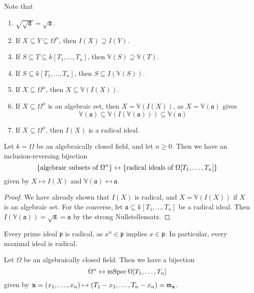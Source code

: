 Note that
\begin{enumerate}
    \item \( \sqrt{\sqrt{\mathfrak a}} = \sqrt{\mathfrak a} \).
    \item If \( X \subseteq Y \subseteq \Omega^n \), then \( I(X) \supseteq I(Y) \).
    \item If \( S \subseteq T \subseteq k[T_1, \dots, T_n] \), then \( \mathbb V(S) \supseteq \mathbb V(T) \).
    \item If \( S \subseteq k[T_1, \dots, T_n] \), then \( S \subseteq I(\mathbb V(S)) \).
    \item If \( X \subseteq \Omega^n \), then \( X \subseteq \mathbb V(I(X)) \).
    \item If \( X \subseteq \Omega^n \) is an algebraic set, then \( X = \mathbb V(I(X)) \), as \( X = \mathbb V(\mathfrak a) \) gives
    \[ \mathbb V(\mathfrak a) \subseteq \mathbb V(I(\mathbb V(\mathfrak a))) \subseteq \mathbb V(\mathfrak a) \]
    \item If \( X \subseteq \Omega^n \), then \( I(X) \) is a radical ideal.
\end{enumerate}
\begin{proposition}
    Let \( k = \Omega \) be an algebraically closed field, and let \( n \geq 0 \).
    Then we have an inclusion-reversing bijection
    \[ \qty{\text{algebraic subsets of } \Omega^n} \leftrightarrow \qty{\text{radical ideals of } \Omega[T_1, \dots, T_n]} \]
    given by \( X \mapsto I(X) \) and \( \mathbb V(\mathfrak a) \mapsfrom \mathfrak a \).
\end{proposition}
\begin{proof}
    We have already shown that \( I(X) \) is radical, and \( X = \mathbb V(I(X)) \) if \( X \) is an algebraic set.
    For the converse, let \( \mathfrak a \subseteq k[T_1, \dots, T_n] \) be a radical ideal.
    Then \( I(\mathbb V(\mathfrak a)) = \sqrt{\mathfrak a} = \mathfrak a \) by the strong Nullstellensatz.
\end{proof}
\begin{remark}
    Every prime ideal \( \mathfrak p \) is radical, as \( x^n \in \mathfrak p \) implies \( x \in \mathfrak p \).
    In particular, every maximal ideal is radical.
\end{remark}
\begin{corollary}
    Let \( \Omega \) be an algebraically closed field.
    Then we have a bijection
    \[ \Omega^n \leftrightarrow \operatorname{mSpec} \Omega[T_1, \dots, T_n] \]
    given by \( \vb x = (x_1, \dots, x_n) \mapsto (T_1 - x_1, \dots, T_n - x_n) = \mathfrak m_{\vb x} \).
\end{corollary}
